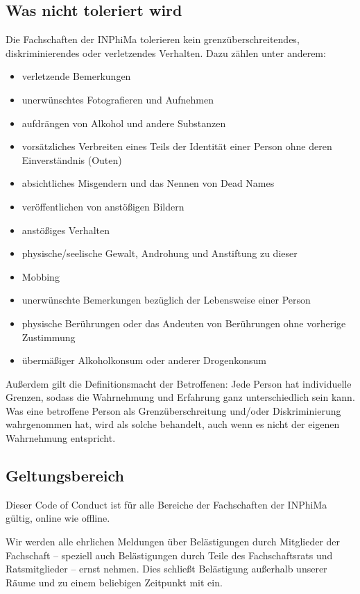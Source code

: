 \documentclass{article}
\begin{document}
\subsection{Was nicht toleriert wird}
Die Fachschaften der INPhiMa tolerieren kein grenzüberschreitendes, diskriminierendes oder verletzendes Verhalten. Dazu zählen unter anderem:
\begin{itemize}
    \item verletzende Bemerkungen
    \item unerwünschtes Fotografieren und Aufnehmen
    \item aufdrängen von Alkohol und andere Substanzen
    \item vorsätzliches Verbreiten eines Teils der Identität einer Person ohne deren Einverständnis (Outen)
    \item absichtliches Misgendern und das Nennen von Dead Names
    \item veröffentlichen von anstößigen Bildern
    \item anstößiges Verhalten
    \item physische/seelische Gewalt, Androhung und Anstiftung zu dieser
    \item Mobbing
    \item unerwünschte Bemerkungen bezüglich der Lebensweise einer Person
    \item physische Berührungen oder das Andeuten von Berührungen ohne vorherige Zustimmung
    \item übermäßiger Alkoholkonsum oder anderer Drogenkonsum
\end{itemize}

Außerdem gilt die Definitionsmacht der Betroffenen: Jede Person hat individuelle Grenzen, sodass die Wahrnehmung und Erfahrung ganz unterschiedlich sein kann. Was eine betroffene Person als Grenzüberschreitung und/oder Diskriminierung wahrgenommen hat, wird als solche behandelt, auch wenn es nicht der eigenen Wahrnehmung entspricht.

\subsection{Geltungsbereich}
Dieser Code of Conduct ist für alle Bereiche der Fachschaften der INPhiMa gültig, online wie offline.

Wir werden alle ehrlichen Meldungen über Belästigungen durch Mitglieder der Fachschaft – speziell auch Belästigungen durch Teile des Fachschaftsrats und Ratsmitglieder – ernst nehmen. Dies schließt Belästigung außerhalb unserer Räume und zu einem beliebigen Zeitpunkt mit ein.
\end{document}
